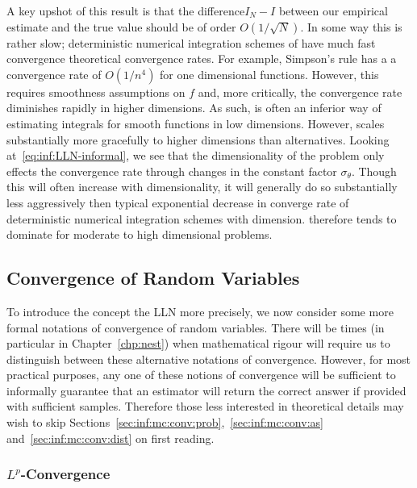 A key upshot of this result is that the difference$I_N-I$  between our empirical estimate and the true value
 should be of order $O(1/\sqrt{N})$.  In some way this is rather slow; deterministic numerical
integration schemes of have much fast convergence theoretical convergence rates.  For example,
Simpson's rule has a a convergence rate of $O(1/n^4)$ for one dimensional functions.  However, this
requires smoothness assumptions on $f$ and, more critically, the convergence rate diminishes rapidly
in higher dimensions.  As such, \mc is often an inferior way of estimating integrals for smooth functions
in low dimensions.  However, \mc scales substantially more gracefully to higher dimensions than
alternatives.  Looking at~\eqref{eq:inf:LLN-informal}, we see that the dimensionality of the problem
only effects the \mc convergence rate through changes in the constant factor $\sigma_{\theta}$.  Though
this will often increase with dimensionality, it will generally do so substantially less aggressively
then typical exponential decrease in converge rate of deterministic numerical integration schemes
with dimension.  \mc therefore tends to dominate for moderate to high dimensional problems.

\subsection{Convergence of Random Variables}
\label{sec:inf:mc:conv}

To introduce the concept the LLN more precisely, we now consider some more formal notations
of convergence of random variables.  There will be times (in particular in Chapter~\ref{chp:nest})
when mathematical rigour will require us to distinguish between these alternative notations of convergence.
However, for most practical purposes, any one of these notions of convergence will be sufficient 
to informally guarantee that an estimator will return the correct answer if provided 
with sufficient samples.  Therefore those less interested in theoretical details may wish to
skip Sections~\ref{sec:inf:mc:conv:prob},~\ref{sec:inf:mc:conv:as} and~\ref{sec:inf:mc:conv:dist}
on first reading.

\subsubsection{$L^p$-Convergence}
\label{sec:inf:mc:conv:Lr}

